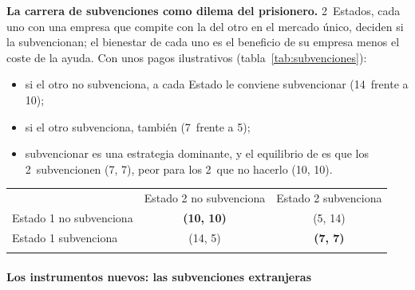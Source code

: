 \documentclass[11pt]{article}
\begin{document}
\begin{anotaciones}
\textbf{La carrera de subvenciones como dilema del prisionero.} 2~Estados, cada uno con una empresa que compite con la del otro en el mercado único, deciden si la subvencionan; el bienestar de cada uno es el beneficio de su empresa menos el coste de la ayuda. Con unos pagos ilustrativos (tabla~\ref{tab:subvenciones}):
\begin{itemize}
\item si el otro no subvenciona, a cada Estado le conviene subvencionar (14~frente a 10);
\item si el otro subvenciona, también (7~frente a 5);
\item subvencionar es una estrategia dominante, y el equilibrio de  es que los 2~subvencionen (7, 7), peor para los 2~que no hacerlo (10, 10).
\end{itemize}
\begin{tablacaja}
\centering
\caption{La carrera de subvenciones como dilema del prisionero (bienestar de cada Estado)}\label{tab:subvenciones}
\begin{tabular}{l|c|c|}
\multicolumn{1}{c}{} & \multicolumn{1}{c}{Estado 2 no subvenciona} & \multicolumn{1}{c}{Estado 2 subvenciona}\\
\hhline{~|-|-|}
Estado 1 no subvenciona & \textcolor{tceeverde}{\textbf{(10, 10)}} & (5, 14)\\
\hhline{~|-|-|}
Estado 1 subvenciona & (14, 5) & \textcolor{tceerojo}{\textbf{(7, 7)}}\\
\hhline{~|-|-|}
\end{tabular}
\end{tablacaja}
\end{anotaciones}

\paragraph{Los instrumentos nuevos: las subvenciones extranjeras}
\end{document}
